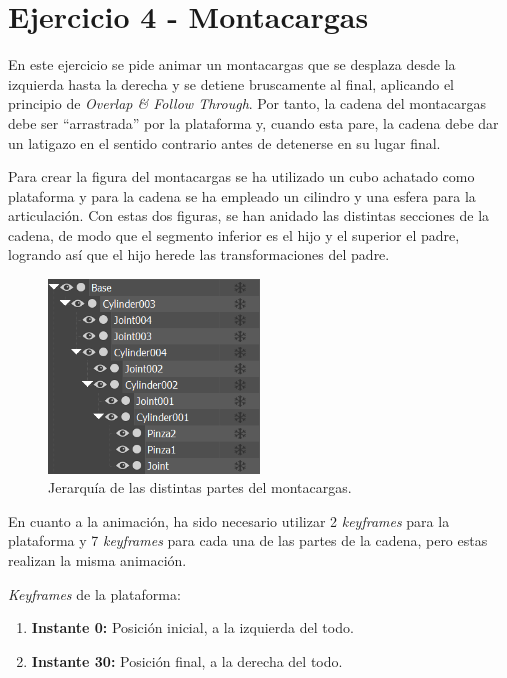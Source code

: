 \documentclass{article}
\begin{document}
\section{Ejercicio 4 - Montacargas}

En este ejercicio se pide animar un montacargas que se desplaza desde la izquierda hasta la derecha y se detiene bruscamente al final, aplicando el principio de \textit{Overlap \& Follow Through}. Por tanto, la cadena del montacargas debe ser ``arrastrada'' por la plataforma y, cuando esta pare, la cadena debe dar un latigazo en el sentido contrario antes de detenerse en su lugar final.

\bigskip

Para crear la figura del montacargas se ha utilizado un cubo achatado como plataforma y para la cadena se ha empleado un cilindro y una esfera para la articulación. Con estas dos figuras, se han anidado las distintas secciones de la cadena, de modo que el segmento inferior es el hijo y el superior el padre, logrando así que el hijo herede las transformaciones del padre.

\begin{figure}[H]
    \centering
    \includegraphics[width=0.5\textwidth]{imagenes/Ejercicio4/jerarquia.png}
    \caption{Jerarquía de las distintas partes del montacargas.}
\end{figure}

\bigskip

En cuanto a la animación, ha sido necesario utilizar 2 \textit{keyframes} para la plataforma y 7 \textit{keyframes} para cada una de las partes de la cadena, pero estas realizan la misma animación.

\bigskip

\textit{Keyframes} de la plataforma:

\begin{enumerate}
    \item \textbf{Instante 0:} Posición inicial, a la izquierda del todo.
    \item \textbf{Instante 30:} Posición final, a la derecha del todo.
\end{enumerate}
\end{document}
